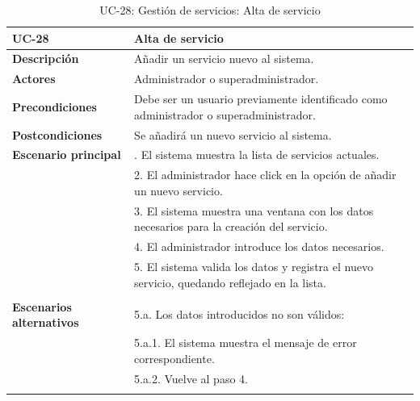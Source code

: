 \begin{table}[H]
  \begin{center}
    \begin{tabularx}{16.4cm}{|l|X|}
      \hline
      \textbf{UC-28} & \textbf{Alta de servicio}\\
      \hline
      \textbf{Descripción} & Añadir un servicio nuevo al sistema.\\
      \hline
      \textbf{Actores} & Administrador o superadministrador.\\
      \hline
      \textbf{Precondiciones} & Debe ser un usuario previamente identificado como administrador o superadministrador.\\
      \hline
      \textbf{Postcondiciones} & Se añadirá un nuevo servicio al sistema.\\
      \hline
      \textbf{Escenario principal} & \smallskip 1. El sistema muestra la lista de servicios actuales.\\
      & 2. El administrador hace click en la opción de añadir un nuevo servicio.\\
      & 3. El sistema muestra una ventana con los datos necesarios para la creación del servicio.\\
      & 4. El administrador introduce los datos necesarios.\\
      & 5. El sistema valida los datos y registra el nuevo servicio, quedando reflejado en la lista.\\
      & \\
      \hline
      \textbf{Escenarios alternativos} & \smallskip 5.a. Los datos introducidos no son válidos:\\
      & \hspace{0.3cm} 5.a.1. El sistema muestra el mensaje de error correspondiente.\\
      & \hspace{0.3cm} 5.a.2. Vuelve al paso 4.\\
      & \\
      \hline
    \end{tabularx}
    \caption{UC-28: Gestión de servicios: Alta de servicio}
    \label{tab:CU-alta-servicio}
  \end{center}
\end{table}



